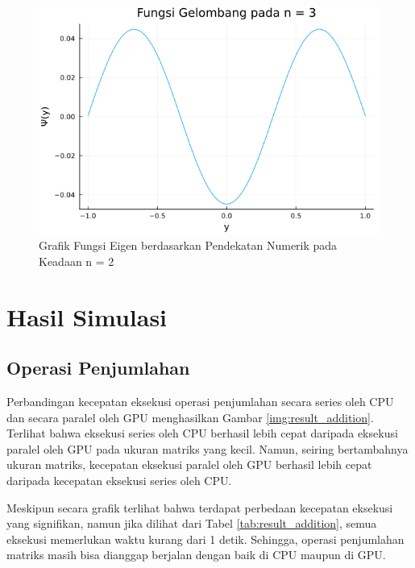 \begin{figure}[H]
	\centering
	\includegraphics[width=14cm, scale=1]{images/penelitian/evaluation_3.png}
	\caption{Grafik Fungsi Eigen berdasarkan Pendekatan Numerik pada Keadaan n = 2}
	\label{img:evaluation_3}
\end{figure}

\section{Hasil Simulasi}

\subsection{Operasi Penjumlahan}

Perbandingan kecepatan eksekusi operasi penjumlahan secara series oleh CPU dan secara paralel oleh GPU menghasilkan Gambar \ref{img:result_addition}. Terlihat bahwa eksekusi series oleh CPU berhasil lebih cepat daripada eksekusi paralel oleh GPU pada ukuran matriks yang kecil. Namun, seiring bertambahnya ukuran matriks, kecepatan eksekusi paralel oleh GPU berhasil lebih cepat daripada kecepatan eksekusi series oleh CPU.

Meskipun secara grafik terlihat bahwa terdapat perbedaan kecepatan eksekusi yang signifikan, namun jika dilihat dari Tabel \ref{tab:result_addition}, semua eksekusi memerlukan waktu kurang dari 1 detik. Sehingga, operasi penjumlahan matriks masih bisa dianggap berjalan dengan baik di CPU maupun di GPU.


